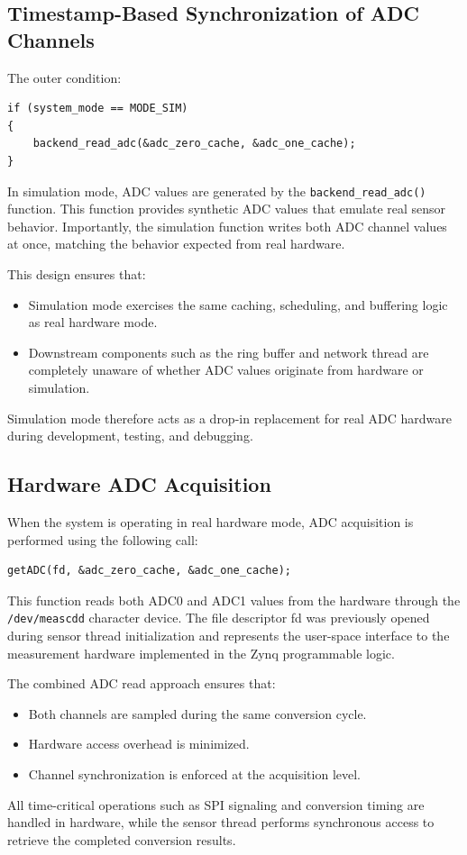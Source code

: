 \subsection{Timestamp-Based Synchronization of ADC Channels}
The outer condition:
\begin{verbatim}
if (system_mode == MODE_SIM)
{
    backend_read_adc(&adc_zero_cache, &adc_one_cache);
}
\end{verbatim}
In simulation mode, ADC values are generated by the \texttt{backend\_read\_adc()} function. This function provides synthetic ADC values that emulate real sensor behavior. Importantly, the simulation function writes both ADC channel values at once, matching the behavior expected from real hardware.

This design ensures that:
\begin{itemize}
    \item Simulation mode exercises the same caching, scheduling, and buffering logic as real hardware mode.

    \item Downstream components such as the ring buffer and network thread are completely unaware of whether ADC values originate from hardware or simulation.
\end{itemize}
Simulation mode therefore acts as a drop-in replacement for real ADC hardware during development, testing, and debugging.

\subsection{Hardware ADC Acquisition}
When the system is operating in real hardware mode, ADC acquisition is performed using the following call:

\begin{verbatim}
getADC(fd, &adc_zero_cache, &adc_one_cache);
\end{verbatim}
This function reads both ADC0 and ADC1 values from the hardware through the \texttt{/dev/meascdd} character device. The file descriptor fd was previously opened during sensor thread initialization and represents the user-space interface to the measurement hardware implemented in the Zynq programmable logic.

The combined ADC read approach ensures that:
\begin{itemize}
    \item Both channels are sampled during the same conversion cycle.

    \item Hardware access overhead is minimized.

    \item Channel synchronization is enforced at the acquisition level.
\end{itemize}
All time-critical operations such as SPI signaling and conversion timing are handled in hardware, while the sensor thread performs synchronous access to retrieve the completed conversion results.

